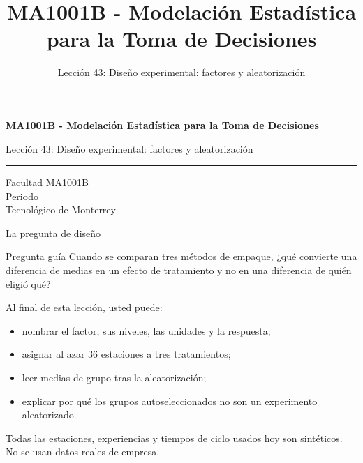 \documentclass[aspectratio=169,10pt,spanish]{beamer}
\title{MA1001B - Modelación Estadística para la Toma de Decisiones}
\subtitle{Lección 43: Diseño experimental: factores y aleatorización}
\author{}
\institute{Tecnol\'ogico de Monterrey}
\date{}
\begin{document}
\begin{frame}[plain]
  \vspace{1.2cm}
  {\Large\bfseries MA1001B - Modelación Estadística para la Toma de Decisiones\par}
  \vspace{0.7cm}
  {\large Lección 43: Diseño experimental: factores y aleatorización\par}
  \vspace{0.7cm}
  {\color{TecRojo}\rule{\textwidth}{1.2pt}}
  \vspace{0.8cm}

  Facultad MA1001B\\[0.3cm]
  Periodo\\[0.3cm]
  Tecnol\'ogico de Monterrey
\end{frame}

\begin{frame}{La pregunta de diseño}
  \begin{alertblock}{Pregunta guía}
    Cuando se comparan tres métodos de empaque, ¿qué convierte una
    diferencia de medias en un efecto de tratamiento y no en una diferencia
    de quién eligió qué?
  \end{alertblock}

  \vspace{0.6em}
  Al final de esta lección, usted puede:
  \begin{itemize}
    \item nombrar el factor, sus niveles, las unidades y la respuesta;
    \item asignar al azar 36 estaciones a tres tratamientos;
    \item leer medias de grupo tras la aleatorización;
    \item explicar por qué los grupos autoseleccionados no son un
      experimento aleatorizado.
  \end{itemize}

  \vfill
  \scriptsize Todas las estaciones, experiencias y tiempos de ciclo usados hoy son sintéticos. No se usan datos reales de empresa.
\end{frame}
\end{document}
